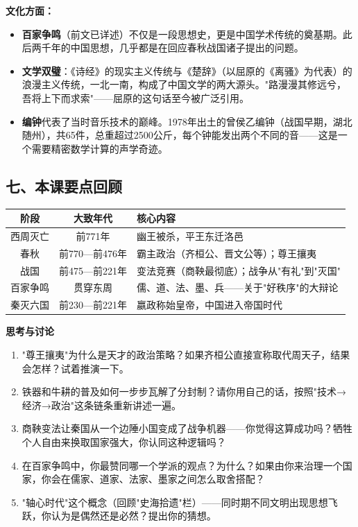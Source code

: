 \documentclass[a4paper,12pt]{ctexart}
\begin{document}
\textbf{文化方面：}
\begin{itemize}
  \item \textbf{百家争鸣}（前文已详述）不仅是一段思想史，更是中国学术传统的奠基期。此后两千年的中国思想，几乎都是在回应春秋战国诸子提出的问题。
  \item \textbf{文学双璧}：《诗经》的现实主义传统与《楚辞》（以屈原的《离骚》为代表）的浪漫主义传统，一北一南，构成了中国文学的两大源头。"路漫漫其修远兮，吾将上下而求索"——屈原的这句话至今被广泛引用。
  \item \textbf{编钟}代表了当时音乐技术的巅峰。1978年出土的曾侯乙编钟（战国早期，湖北随州），共65件，总重超过2500公斤，每个钟能发出两个不同的音——这是一个需要精密数学计算的声学奇迹。
\end{itemize}

\subsection*{七、本课要点回顾}

\begin{center}
\begin{tabular}{|c|c|p{8cm}|}
\hline
\textbf{阶段} & \textbf{大致年代} & \textbf{核心内容} \\
\hline
西周灭亡 & 前771年 & 幽王被杀，平王东迁洛邑 \\
\hline
春秋 & 前770—前476年 & 霸主政治（齐桓公、晋文公等）；尊王攘夷 \\
\hline
战国 & 前475—前221年 & 变法竞赛（商鞅最彻底）；战争从"有礼"到"灭国" \\
\hline
百家争鸣 & 贯穿东周 & 儒、道、法、墨、兵——关于"好秩序"的大辩论 \\
\hline
秦灭六国 & 前230—前221年 & 嬴政称始皇帝，中国进入帝国时代 \\
\hline
\end{tabular}
\end{center}

{\large\textcolor{orange!80!black}{\textbf{思考与讨论}}}
\begin{enumerate}
  \item "尊王攘夷"为什么是天才的政治策略？如果齐桓公直接宣称取代周天子，结果会怎样？试着推演一下。
  \item 铁器和牛耕的普及如何一步步瓦解了分封制？请你用自己的话，按照"技术→经济→政治"这条链条重新讲述一遍。
  \item 商鞅变法让秦国从一个边陲小国变成了战争机器——你觉得这算成功吗？牺牲个人自由来换取国家强大，你认同这种逻辑吗？
  \item 在百家争鸣中，你最赞同哪一个学派的观点？为什么？如果由你来治理一个国家，你会在儒家、道家、法家、墨家之间怎么取舍搭配？
  \item "轴心时代"这个概念（回顾"史海拾遗"栏）——同时期不同文明出现思想飞跃，你认为是偶然还是必然？提出你的猜想。
\end{enumerate}
\end{document}
